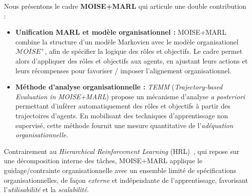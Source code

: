 \documentclass[francais,ROIA,Unicode,manuscript]{cedram}
\begin{document}
\noindent Nous présentons le cadre \textbf{MOISE+MARL} qui articule une double contribution :
%
\begin{itemize}
    \item \textbf{Unification MARL et modèle organisationnel : }
          MOISE+MARL combine la structure d'un modèle Markovien avec le modèle organisationel $\mathcal{M}OISE^+$, afin de spécifier la logique des rôles et objectifs. Le cadre permet alors d'appliquer des rôles et objectifs aux agents, en ajustant leurs actions et leurs récompenses pour favoriser / imposer l’alignement organisationnel.
    \item \textbf{Méthode d'analyse organisationnelle : }
          \textit{TEMM} (\textit{Trajectory-based Evaluation in MOISE+MARL}) propose un mécanisme d’analyse \emph{a posteriori} permettant d’inférer automatiquement des rôles et objectifs à partir des trajectoires d’agents. En mobilisant des techniques d’apprentissage non supervisé, cette méthode fournit une mesure quantitative de l’\emph{adéquation organisationnelle}.
\end{itemize}

\noindent Contrairement au \textit{Hierarchical Reinforcement Learning} (HRL)~\cite{Qi2024,Matsuyama2025}, qui repose sur une décomposition interne des tâches, MOISE+MARL applique le guidage/contrainte organisationnelle avec un ensemble limité de spécifications organisationnelles, de façon \emph{externe} et indépendante de l'apprentissage, favorisant l’\emph{utilisabilité} et la \emph{scalabilité}.
\end{document}
